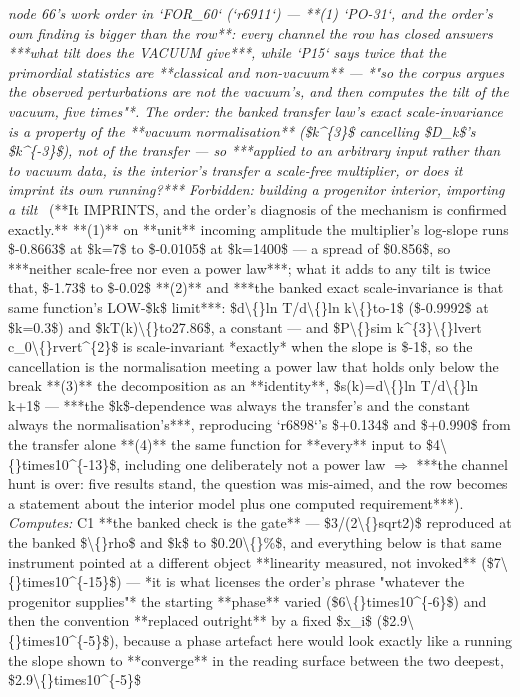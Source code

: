 \begin{description}
\textit{node 66's work order in `FOR\_60` (`r6911`) --- **(1) `PO-31`, and the order's own finding is bigger than the row**: every channel the row has closed answers ***what tilt does the VACUUM give***, while `P15` says twice that the primordial statistics are **classical and non-vacuum** --- *"so the corpus argues the observed perturbations are not the vacuum's, and then computes the tilt of the vacuum, five times"*. The order: the banked transfer law's exact scale-invariance is a property of the **vacuum normalisation** (\$k\textasciicircum{}\{3\}\$ cancelling \$D\_k\$'s \$k\textasciicircum{}\{-3\}\$), not of the transfer --- so ***applied to an arbitrary input rather than to vacuum data, is the interior's transfer a scale-free multiplier, or does it imprint its own running?*** Forbidden: building a progenitor interior, importing a tilt} \ (**It IMPRINTS, and the order's diagnosis of the mechanism is confirmed exactly.**  **(1)** on **unit** incoming amplitude the multiplier's log-slope runs \$-0.8663\$ at \$k=7\$ to \$-0.0105\$ at \$k=1400\$ --- a spread of \$0.856\$, so ***neither scale-free nor even a power law***; what it adds to any tilt is twice that, \$-1.73\$ to \$-0.02\$  **(2)** and  ***the banked exact scale-invariance is that same function's LOW-\$k\$ limit***: \$d\textbackslash\{\}ln T/d\textbackslash\{\}ln k\textbackslash\{\}to-1\$ (\$-0.9992\$ at \$k=0.3\$) and \$kT(k)\textbackslash\{\}to27.86\$, a constant --- and \$P\textbackslash\{\}sim k\textasciicircum{}\{3\}\textbackslash\{\}lvert c\_0\textbackslash\{\}rvert\textasciicircum{}\{2\}\$ is scale-invariant *exactly* when the slope is \$-1\$, so the cancellation is the normalisation meeting a power law that holds only below the break  **(3)** the decomposition as an **identity**, \$s(k)=d\textbackslash\{\}ln T/d\textbackslash\{\}ln k+1\$ --- ***the \$k\$-dependence was always the transfer's and the constant always the normalisation's***, reproducing `r6898`'s \$+0.134\$ and \$+0.990\$ from the transfer alone  **(4)** the same function for **every** input to \$4\textbackslash\{\}times10\textasciicircum{}\{-13\}\$, including one deliberately not a power law \ensuremath{\Rightarrow}  ***the channel hunt is over: five results stand, the question was mis-aimed, and the row becomes a statement about the interior model plus one computed requirement***). 
\emph{Computes:} C1 **the banked check is the gate** --- \$3/(2\textbackslash\{\}sqrt2)\$ reproduced at the banked \$\textbackslash\{\}rho\$ and \$k\$ to \$0.20\textbackslash\{\}\%\$, and everything below is that same instrument pointed at a different object  **linearity measured, not invoked** (\$7\textbackslash\{\}times10\textasciicircum{}\{-15\}\$) --- *it is what licenses the order's phrase "whatever the progenitor supplies"*  the starting **phase** varied (\$6\textbackslash\{\}times10\textasciicircum{}\{-6\}\$) and then the convention **replaced outright** by a fixed \$x\_i\$ (\$2.9\textbackslash\{\}times10\textasciicircum{}\{-5\}\$), because a phase artefact here would look exactly like a running  the slope shown to **converge** in the reading surface between the two deepest, \$2.9\textbackslash\{\}times10\textasciicircum{}\{-5\}\$

\end{description}
